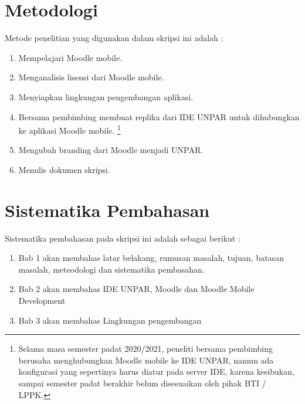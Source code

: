 \section{Metodologi}
\label{sec:metlit}
Metode penelitian yang digunakan dalam skripsi ini adalah :
\begin{enumerate}
		\item Mempelajari Moodle mobile.
		\item Menganalisis lisensi dari Moodle mobile.
		\item Menyiapkan lingkungan pengembangan aplikasi.
		\item Bersama pembimbing membuat replika dari IDE UNPAR untuk dihubungkan ke aplikasi Moodle mobile. \footnote{Selama masa semester padat 2020/2021, peneliti bersama pembimbing berusaha menghubungkan Moodle mobile ke IDE UNPAR, namun ada konfigurasi yang sepertinya harus diatur pada server IDE, karena kesibukan, sampai semester padat berakhir belum disesuaikan oleh pihak BTI / LPPK.}
		\item Mengubah branding dari Moodle menjadi UNPAR.
		\item Menulis dokumen skripsi.
\end{enumerate}

\section{Sistematika Pembahasan}
\label{sec:sispem}
 Sistematika pembahasan pada skripsi ini adalah sebagai berikut :
 \begin{enumerate}
 	\item Bab 1 akan membahas latar belakang, rumusan masalah, tujuan, batasan masalah, meteodologi dan sistematika pembasahan.
 	\item Bab 2 akan membahas IDE UNPAR, Moodle dan Moodle Mobile Development
	\item Bab 3 akan membahas Lingkungan pengembangan
 \end{enumerate}